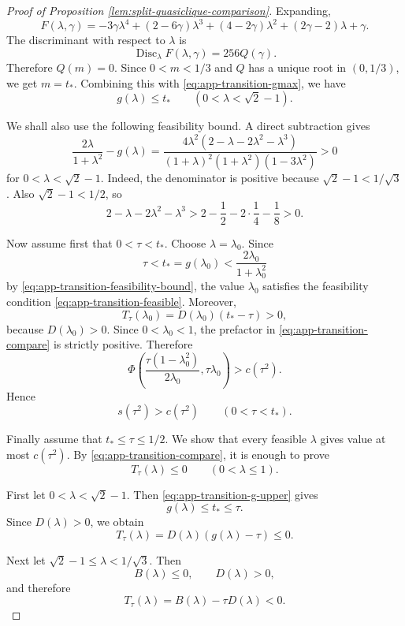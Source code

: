 \documentclass[10pt,a4paper]{article}
\begin{document}
\begin{proof}[Proof of Proposition \ref{lem:split-quasiclique-comparison}]
Expanding,
\[
F(\lambda,\gamma)
=
-3\gamma\lambda^4
+(2-6\gamma)\lambda^3
+(4-2\gamma)\lambda^2
+(2\gamma-2)\lambda
+\gamma .
\]
The discriminant with respect to \(\lambda\) is
\[
\operatorname{Disc}_\lambda F(\lambda,\gamma)
=
256Q(\gamma).
\]
Therefore $Q(m)=0$.
Since \(0<m<1/3\) and \(Q\) has a unique root in \((0,1/3)\), we get
$m=t_*$.
Combining this with \eqref{eq:app-transition-gmax}, we have
\begin{equation}\label{eq:app-transition-g-upper}
g(\lambda)\le t_*
\qquad
(0<\lambda<\sqrt{2}-1).
\end{equation}


We shall also use the following feasibility bound. A direct subtraction gives
\begin{equation}\label{eq:app-transition-feasibility-bound}
\frac{2\lambda}{1+\lambda^2}-g(\lambda)
=
\frac{4\lambda^2(2-\lambda-2\lambda^2-\lambda^3)}
{(1+\lambda)^2(1+\lambda^2)(1-3\lambda^2)}
>0
\end{equation}
for \(0<\lambda<\sqrt{2}-1\). Indeed, the denominator is positive because
\(\sqrt{2}-1<1/\sqrt{3}\). Also \(\sqrt{2}-1<1/2\), so
\[
2-\lambda-2\lambda^2-\lambda^3
>
2-\frac12-2\cdot\frac14-\frac18>0.
\]


Now assume first that \(0<\tau<t_*\). Choose \(\lambda=\lambda_0\). Since
\[
\tau<t_*=g(\lambda_0)
<
\frac{2\lambda_0}{1+\lambda_0^2}
\]
by \eqref{eq:app-transition-feasibility-bound}, the value \(\lambda_0\)
satisfies the feasibility condition \eqref{eq:app-transition-feasible}.
Moreover,
\[
T_\tau(\lambda_0)
=
D(\lambda_0)(t_*-\tau)>0,
\]
because \(D(\lambda_0)>0\). Since \(0<\lambda_0<1\), the prefactor in
\eqref{eq:app-transition-compare} is strictly positive. Therefore
\[
\Phi\left(\frac{\tau(1-\lambda_0^2)}{2\lambda_0},\tau\lambda_0\right)
>
c(\tau^2).
\]
Hence
\[
s(\tau^2)>c(\tau^2)
\qquad
(0<\tau<t_*).
\]


Finally assume that \(t_*\le\tau\le1/2\). We show that every feasible
\(\lambda\) gives value at most \(c(\tau^2)\). By
\eqref{eq:app-transition-compare}, it is enough to prove
\[
T_\tau(\lambda)\le0
\qquad
(0<\lambda\le1).
\]


First let \(0<\lambda<\sqrt{2}-1\). Then
\eqref{eq:app-transition-g-upper} gives
\[
g(\lambda)\le t_*\le\tau.
\]
Since \(D(\lambda)>0\), we obtain
\[
T_\tau(\lambda)
=
D(\lambda)(g(\lambda)-\tau)\le0.
\]


Next let \(\sqrt{2}-1\le\lambda<1/\sqrt{3}\). Then
\[
B(\lambda)\le0,
\qquad
D(\lambda)>0,
\]
and therefore
\[
T_\tau(\lambda)=B(\lambda)-\tau D(\lambda)<0.
\]



\end{proof}
\end{document}
